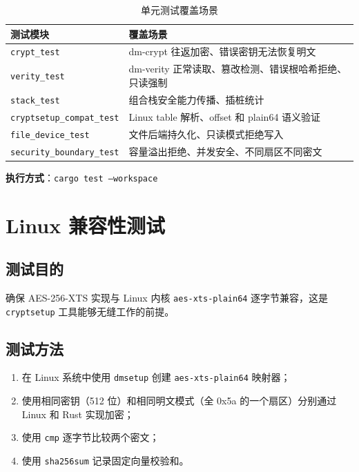 \begin{table}[H]
    \centering
    \caption{单元测试覆盖场景}
    \begin{tabular}{p{}p{}}
        \toprule
        \textbf{测试模块} & \textbf{覆盖场景} \\
        \midrule
        \texttt{crypt\_test} & dm-crypt 往返加密、错误密钥无法恢复明文 \\
        \texttt{verity\_test} & dm-verity 正常读取、篡改检测、错误根哈希拒绝、只读强制 \\
        \texttt{stack\_test} & 组合栈安全能力传播、插桩统计 \\
        \texttt{cryptsetup\_compat\_test} & Linux table 解析、offset 和 plain64 语义验证 \\
        \texttt{file\_device\_test} & 文件后端持久化、只读模式拒绝写入 \\
        \texttt{security\_boundary\_test} & 容量溢出拒绝、并发安全、不同扇区不同密文 \\
        \bottomrule
    \end{tabular}
\end{table}

\textbf{执行方式}：\texttt{cargo test --workspace}

\section{Linux 兼容性测试}

\subsection{测试目的}
确保 AES-256-XTS 实现与 Linux 内核 \texttt{aes-xts-plain64} 逐字节兼容，这是 \texttt{cryptsetup} 工具能够无缝工作的前提。

\subsection{测试方法}
\begin{enumerate}
    \item 在 Linux 系统中使用 \texttt{dmsetup} 创建 \texttt{aes-xts-plain64} 映射器；
    \item 使用相同密钥（512 位）和相同明文模式（全 0x5a 的一个扇区）分别通过 Linux 和 Rust 实现加密；
    \item 使用 \texttt{cmp} 逐字节比较两个密文；
    \item 使用 \texttt{sha256sum} 记录固定向量校验和。
\end{enumerate}

